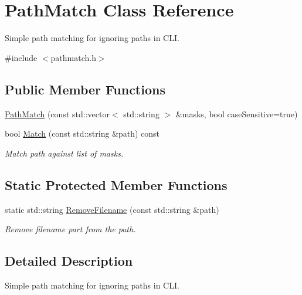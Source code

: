 \hypertarget{class_path_match}{\section{Path\-Match Class Reference}
\label{class_path_match}
}


Simple path matching for ignoring paths in C\-L\-I.  




{\ttfamily \#include $<$pathmatch.\-h$>$}

\subsection*{Public Member Functions}
\begin{DoxyCompactItemize}
\item 
\hyperlink{class_path_match_ace1680e3d07b51a6dc40f27a6e1eae04}{Path\-Match} (const std\-::vector$<$ std\-::string $>$ \&masks, bool case\-Sensitive=true)
\item 
bool \hyperlink{class_path_match_a2324c187442895aa2ac36eead340b75b}{Match} (const std\-::string \&path) const 
\begin{DoxyCompactList}\small\item\em Match path against list of masks. \end{DoxyCompactList}\end{DoxyCompactItemize}
\subsection*{Static Protected Member Functions}
\begin{DoxyCompactItemize}
\item 
static std\-::string \hyperlink{class_path_match_acc7b9a9e9efeb0c69ac3886ca8a1450a}{Remove\-Filename} (const std\-::string \&path)
\begin{DoxyCompactList}\small\item\em Remove filename part from the path. \end{DoxyCompactList}\end{DoxyCompactItemize}


\subsection{Detailed Description}
Simple path matching for ignoring paths in C\-L\-I. 

